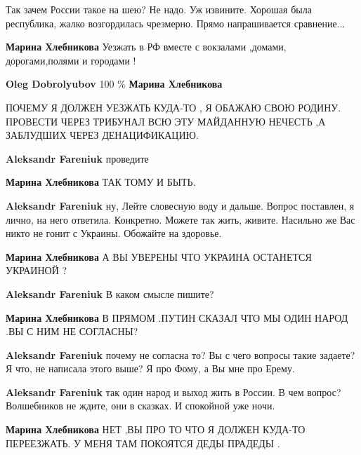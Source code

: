 \begin{itemize}
Так зачем России такое на шею? Не надо. Уж извините. Хорошая была республика,
жалко возгордилась чрезмерно. Прямо напрашивается сравнение...

\begin{itemize} %
\textbf{Марина Хлебникова} Уезжать в РФ вместе с вокзалами ,домами, дорогами,полями и городами !

\textbf{Oleg Dobrolyubov} 100 \%
\textbf{Марина Хлебникова} 

ПОЧЕМУ Я ДОЛЖЕН УЕЗЖАТЬ КУДА-ТО , Я ОБАЖАЮ СВОЮ РОДИНУ. ПРОВЕСТИ ЧЕРЕЗ ТРИБУНАЛ
ВСЮ ЭТУ МАЙДАННУЮ НЕЧЕСТЬ ,А ЗАБЛУДШИХ ЧЕРЕЗ ДЕНАЦИФИКАЦИЮ.

\textbf{Aleksandr Fareniuk} проведите

\textbf{Марина Хлебникова} ТАК ТОМУ И БЫТЬ.

\textbf{Aleksandr Fareniuk} ну, Лейте словесную воду и дальше. Вопрос поставлен, я лично, на него ответила. Конкретно.
Можете так жить, живите. Насильно же Вас никто не гонит с Украины. Обожайте на здоровье.

\textbf{Марина Хлебникова} А ВЫ УВЕРЕНЫ ЧТО УКРАИНА ОСТАНЕТСЯ УКРАИНОЙ ?

\textbf{Aleksandr Fareniuk} В каком смысле пишите?

\textbf{Марина Хлебникова} В ПРЯМОМ .ПУТИН СКАЗАЛ ЧТО МЫ ОДИН НАРОД .ВЫ С НИМ НЕ СОГЛАСНЫ?

\textbf{Aleksandr Fareniuk} почему не согласна то? Вы с чего вопросы такие задаете? Я что, не написала этого выше?
Я про Фому, а Вы мне про Ерему.

\textbf{Aleksandr Fareniuk} так один народ и выход жить в России. В чем вопрос? Волшебников не ждите, они в сказках. И спокойной уже ночи.

\textbf{Марина Хлебникова} НЕТ ,ВЫ ПРО ТО ЧТО Я ДОЛЖЕН КУДА-ТО ПЕРЕЕЗЖАТЬ. У МЕНЯ ТАМ ПОКОЯТСЯ ДЕДЫ ПРАДЕДЫ .
\end{itemize} %



\end{itemize}
